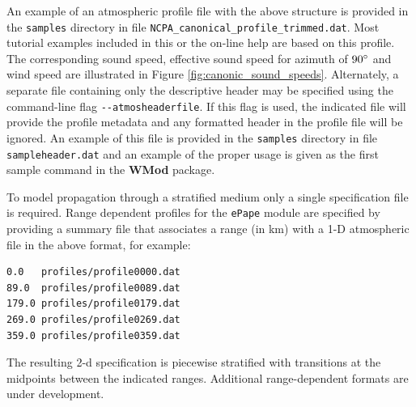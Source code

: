 An example of an atmospheric profile file with the above structure is provided in the \verb"samples" directory in file \verb"NCPA_canonical_profile_trimmed.dat". Most tutorial examples included in this or the on-line help are based on this profile. The corresponding sound speed, effective sound speed for azimuth of $90\degree$ and wind speed are illustrated in Figure \ref{fig:canonic_sound_speeds}.  Alternately, a separate file containing only the descriptive header may be specified using the command-line flag \verb"--atmosheaderfile".  If this flag is used, the indicated file will provide the profile metadata and any formatted header in the profile file will be ignored.  An example of this file is provided in the \verb"samples" directory in file \verb"sampleheader.dat" and an example of the proper usage is given as the first sample command in the {\bf WMod} package.

To model propagation through a stratified medium only a single specification file is required. Range dependent profiles for the \verb"ePape" module are specified by providing a summary file that associates a range (in km) with a 1-D atmospheric file in the above format, for example:

\begin{minipage}{\linewidth}
\begin{verbatim}
0.0   profiles/profile0000.dat
89.0  profiles/profile0089.dat
179.0 profiles/profile0179.dat
269.0 profiles/profile0269.dat
359.0 profiles/profile0359.dat
\end{verbatim}
\end{minipage}

\noindent The resulting 2-d specification is piecewise stratified with transitions at the midpoints between the indicated ranges. Additional range-dependent formats are under development.